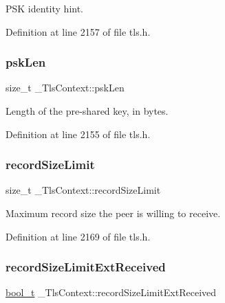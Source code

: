 P\+SK identity hint. 



Definition at line 2157 of file tls.\+h.

\mbox{\label{struct__TlsContext_a4c6dc0ac8ff861b8291e15fc85825039}} 
\subsubsection{\texorpdfstring{psk\+Len}{pskLen}}
{\footnotesize\ttfamily size\+\_\+t \+\_\+\+Tls\+Context\+::psk\+Len}



Length of the pre-\/shared key, in bytes. 



Definition at line 2155 of file tls.\+h.

\mbox{\label{struct__TlsContext_a36ccbeabfa4a3dad22fe9ad2cfa63ab0}} 
\subsubsection{\texorpdfstring{record\+Size\+Limit}{recordSizeLimit}}
{\footnotesize\ttfamily size\+\_\+t \+\_\+\+Tls\+Context\+::record\+Size\+Limit}



Maximum record size the peer is willing to receive. 



Definition at line 2169 of file tls.\+h.

\mbox{\label{struct__TlsContext_a900511a047bccf50a2dbb4135022299f}} 
\subsubsection{\texorpdfstring{record\+Size\+Limit\+Ext\+Received}{recordSizeLimitExtReceived}}
{\footnotesize\ttfamily \hyperlink{compiler__port_8h_a812d16e5494522586b3784e55d479912}{bool\+\_\+t} \+\_\+\+Tls\+Context\+::record\+Size\+Limit\+Ext\+Received}



